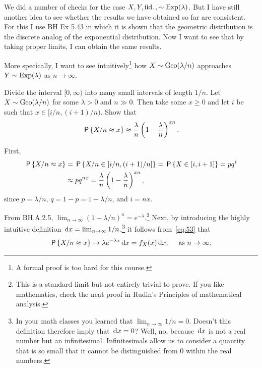 \documentclass[a4paper,11pt]{article}
\begin{document}
We did a number of checks for the case $X, Y, \iid, \sim\Exp{\lambda}$.
But I have still another idea to see whether the results we have obtained so far are consistent.
For this I use BH Ex 5.43 in which it is shown that the geometric distribution is the discrete analog of the exponential distribution.
Now I want to see that  by taking proper limits, I can  obtain the same results.

More specically, I want to see intuitively\footnote{A formal proof is too hard for this course.} how $X\sim \Geo{\lambda/n}$ approaches  $Y\sim\Exp{\lambda}$ as $n\to\infty$.

\begin{exercise}\label{ex:7} 
Divide the interval $[0, \infty)$ into many small intervals of length $1/n$.
Let  $X\sim \Geo{\lambda/n}$ for some $\lambda>0$ and $n\gg 0$. Then take  some $x\geq 0$ and  let $i$ be such that $x\in[i/n, (i+1)/n)$.
Show that 
\begin{align}\label{eq:53}
\P{X/n \approx x} \approx \frac{\lambda} n \left(1-\frac \lambda n\right)^{xn}.
\end{align}
\begin{solution}
First, 
\begin{align}
\P{X/n \approx x} &= \P{X/n \in [i/n, (i+1)/n]} = \P{X \in [i, i+1]} = p q^{i} \\
&\approx p q^{n x} = \frac{\lambda} n \left(1-\frac \lambda n\right)^{xn},
\end{align}
since $p=\lambda/n$, $q=1-p=1-\lambda/n$, and $i=nx$.
\end{solution}
\end{exercise}
From BH.A.2.5, $\lim_{n\to\infty}(1-\lambda/n)^{n} = e^{-\lambda}$.\footnote{This is a standard limit but not entirely trivial to prove. If you like mathematics, check the neat proof in Rudin's Principles of mathematical analysis.}
Next, by introducing the highly intuitive definition $\d x = \lim_{n\to \infty} 1/n$,\footnote{In your math classes you learned that $\lim_{n\to \infty} 1/n = 0$. Doesn't this definition therefore imply that $\d x = 0$? Well, no, because $\d x$ is not a real number but an infinitesimal. Infinitesimals allow us to consider a quantity that is so small that it cannot be distinguished from 0 within the real numbers.}  it follows from~\cref{eq:53} that
\begin{align}
\P{X/n \approx x} \to \lambda e^{-\lambda x} \d x = f_{X}(x) \d x,\quad\text{ as } n \to \infty.
\end{align}
\end{document}
